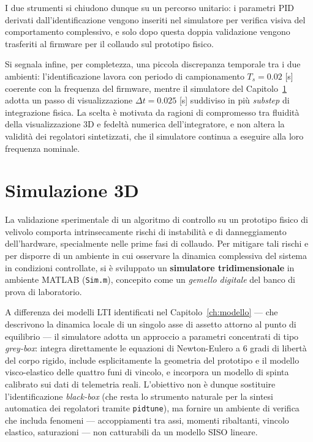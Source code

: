 \documentclass[11pt]{report}
\begin{document}
I due strumenti si chiudono dunque su un percorso unitario: i parametri PID derivati dall'identificazione vengono inseriti nel simulatore per verifica visiva del comportamento complessivo, e solo dopo questa doppia validazione vengono trasferiti al firmware per il collaudo sul prototipo fisico.

Si segnala infine, per completezza, una piccola discrepanza temporale tra i due ambienti: l'identificazione lavora con periodo di campionamento $T_s = 0.02$ [s] coerente con la frequenza del firmware, mentre il simulatore del Capitolo~\ref{ch:simulazione} adotta un passo di visualizzazione $\Delta t = 0.025$ [s] suddiviso in più \textit{substep} di integrazione fisica. La scelta è motivata da ragioni di compromesso tra fluidità della visualizzazione 3D e fedeltà numerica dell'integratore, e non altera la validità dei regolatori sintetizzati, che il simulatore continua a eseguire alla loro frequenza nominale.

	\chapter{Simulazione 3D}
	\label{ch:simulazione}
	
	La validazione sperimentale di un algoritmo di controllo su un prototipo fisico di velivolo comporta intrinsecamente rischi di instabilità e di danneggiamento dell'hardware, specialmente nelle prime fasi di collaudo. Per mitigare tali rischi e per disporre di un ambiente in cui osservare la dinamica complessiva del sistema in condizioni controllate, si è sviluppato un \textbf{simulatore tridimensionale} in ambiente MATLAB (\texttt{Sim.m}), concepito come un \textit{gemello digitale} del banco di prova di laboratorio.
	
	A differenza dei modelli LTI identificati nel Capitolo~\ref{ch:modello} --- che descrivono la dinamica locale di un singolo asse di assetto attorno al punto di equilibrio --- il simulatore adotta un approccio a parametri concentrati di tipo \textit{grey-box}: integra direttamente le equazioni di Newton-Eulero a 6 gradi di libertà del corpo rigido, include esplicitamente la geometria del prototipo e il modello visco-elastico delle quattro funi di vincolo, e incorpora un modello di spinta calibrato sui dati di telemetria reali. L'obiettivo non è dunque sostituire l'identificazione \textit{black-box} (che resta lo strumento naturale per la sintesi automatica dei regolatori tramite \texttt{pidtune}), ma fornire un ambiente di verifica che includa fenomeni --- accoppiamenti tra assi, momenti ribaltanti, vincolo elastico, saturazioni --- non catturabili da un modello SISO lineare.
	
\end{document}

